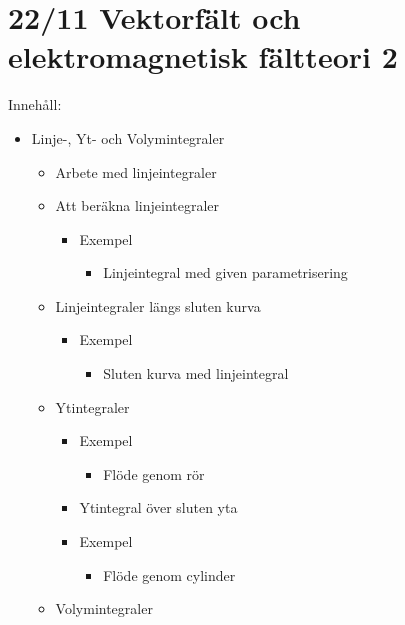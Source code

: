 \section{22/11 \quad Vektorfält och elektromagnetisk fältteori \quad \textcircled{2}}

Innehåll:
\begin{itemize}[label=--]
  \item Linje-, Yt- och Volymintegraler
  \begin{itemize}[label=+]
    \item Arbete med linjeintegraler
    \item Att beräkna linjeintegraler
    \begin{itemize}[label=--]
      \item Exempel
      \begin{itemize}[label=+]
        \item Linjeintegral med given parametrisering
      \end{itemize}
    \end{itemize}
    \item Linjeintegraler längs sluten kurva
    \begin{itemize}[label=--]
      \item Exempel
      \begin{itemize}[label=+]
        \item Sluten kurva med linjeintegral
      \end{itemize}
    \end{itemize}
    \item Ytintegraler
    \begin{itemize}[label=--]
      \item Exempel
      \begin{itemize}[label=+]
        \item Flöde genom rör
      \end{itemize}
      \item Ytintegral över sluten yta
      \item Exempel
      \begin{itemize}[label=+]
        \item Flöde genom cylinder
      \end{itemize}
    \end{itemize}
    \item Volymintegraler
  \end{itemize}
\end{itemize}
